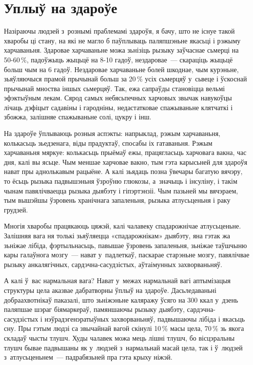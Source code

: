 \section{Уплыў на здароўе}

Назіраючы людзей з~рознымі праблемамі здароўя, я бачу, што не існуе такой хваробы ці стану, на які не магло б паўплываць паляпшэньне якасьці і рэжыму харчаваньня. Здаровае харчаваньне можа зьнізіць рызыку заўчаснае сьмерці на 50-60\,\%, падоўжыць жыцьцё на 8-10 гадоў, нездаровае~--- скараціць жыцьцё больш чым на 6 гадоў. Нездаровае харчаваньне болей шкоднае, чым курэньне, зьяўляючыся прамой прычынай больш за 20\,\% усіх сьмерцяў у~сьвеце і ўскоснай прычынай мноства іншых сьмерцяў. Так, ежа сапраўды становіцца вельмі эфэктыўным лекам. Сярод самых небясьпечных харчовых звычак навукоўцы лічаць дэфіцыт садавіны і гародніны, недастатковае спажываньне клятчаткі і збожжа, залішняе спажываньне солі, цукру і інш.

На здароўе ўплываюць розныя аспэкты: напрыклад, рэжым харчаваньня, колькасьць зьедзенага, віды прадуктаў, спосабы іх гатаваньня. Рэжым харчаваньня мяркуе: колькасьць прыёмаў ежы, працягласьць харчовага вакна, час дня, калі вы ясьце. Чым меншае харчовае вакно, тым гэта карысьней для здароўя нават пры аднолькавым рацыёне. А калі зьядаць позна ўвечары багатую вячэру, то ёсьць рызыка падвышэньня ўзроўню глюкозы, а~значыць і інсуліну, і такім чынам павялічваецца рызыка дыябэту і гіпэртэнзіі. Чым пазьней мы вячэраем, тым вышэйшы ўзровень хранічнага запаленьня, рызыка атлусьценьня і раку грудзей.

Многія хваробы працякаюць цяжэй, калі чалавеку спадарожнічае атлусьценьне. Залішняя вага ня толькі зьяўляецца «спадарожнікам» дыябэту, яна гэтак жа зьніжае лібіда, фэртыльнасьць, павышае ўзровень запаленьня, зьніжае таўшчыню кары галаўнога мозгу~--- нават у~падлеткаў, паскарае старэньне мозгу, павялічвае рызыку анкалягічных, сардэчна-сасудзістых, аўтаімунных захворваньняў.

А калі ў~вас нармальная вага? Нават у~межах нармальнай вагі аптымізацыя структуры цела аказвае дабратворны ўплыў на здароўе. Дасьледаваньні добраахвотнікаў паказалі, што зьніжэньне каляражу ўсяго на 300 ккал у~дзень паляпшае шэраг біямаркераў, памяншаючы рызыку дыябэту, сардэчна-сасудзістых і нэўрадэгенэратыўных захворваньняў, падвышаючы лібіда і якасьць сну. Пры гэтым людзі са звычайнай вагой скінулі 10\,\% масы цела, 70\,\% зь якога складаў чысты тлушч. Худы чалавек можа мець лішні тлушч, бо вісцэральны тлушч бывае падвышаны як у~людзей з~нармальнай масай цела, так і ў~людзей з~атлусьценьнем~--- падрабязьней пра гэта крыху ніжэй.

